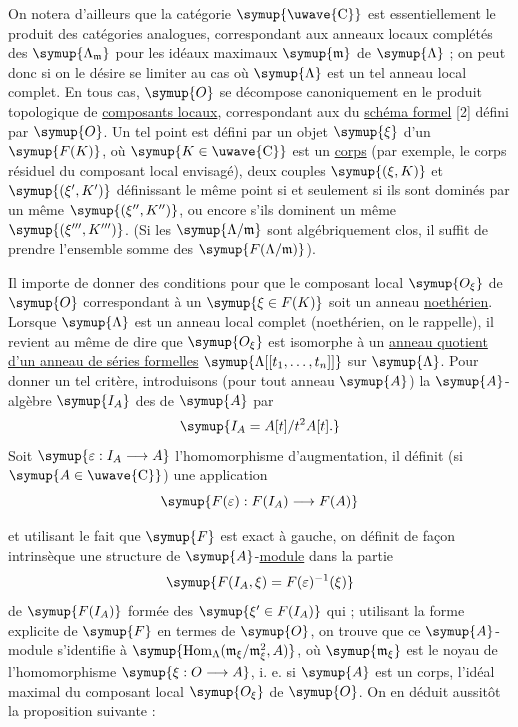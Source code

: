 On notera d'ailleurs que la catégorie $\symup{\text{\uwave{C}}}$ est essentiellement le
produit des catégories analogues, correspondant aux anneaux locaux complétés
des $\symup{\Lambda_{\mathfrak m}}$ pour les idéaux maximaux $\symup{\mathfrak m}$ de
$\symup{\Lambda}$ ; on peut donc si on le désire se limiter au cas où $\symup{\Lambda}$ est un
tel anneau local complet. En tous cas, $\symup{O}$ se décompose canoniquement en le
produit topologique de \uline{composants locaux}, correspondant aux  du
\uline{schéma formel} [2] défini par $\symup{O}$. Un tel point est défini par un objet $\symup{\xi}$
d'un $\symup{F(K)}$, où $\symup{K\in\text{\uwave{C}}}$ est un \uline{corps} (par exemple, le corps résiduel
du composant local envisagé), deux couples $\symup{(\xi,K)}$ et $\symup{(\xi',K')}$
définissant le même point si et seulement si ils sont dominés par un même
$\symup{(\xi'',K'')}$, ou encore s'ils dominent un même $\symup{(\xi''',K''')}$. (Si les
$\symup{\Lambda/\mathfrak m}$ sont algébriquement clos, il suffit de prendre l'ensemble
somme des $\symup{F(\Lambda/\mathfrak m)}$).

Il importe de donner des conditions pour que le composant local $\symup{O_\xi}$ de
$\symup{O}$ correspondant à un $\symup{\xi\in F(K)}$ soit un anneau \uline{noethérien}. Lorsque
$\symup{\Lambda}$ est un anneau local complet (noethérien, on le rappelle), il revient
au même de dire que $\symup{O_\xi}$ est isomorphe à un \uline{anneau quotient d'un anneau de séries formelles} $\symup{\Lambda[[t_1,\ldots,t_n]]}$ sur $\symup{\Lambda}$. Pour donner un tel
critère, introduisons (pour tout anneau $\symup{A}$) la $\symup{A}$-algèbre $\symup{I_A}$ des  de $\symup{A}$ par
\[
  \symup{I_A=A[t]/t^2A[t].}
\]
Soit $\symup{\varepsilon:I_A\longrightarrow A}$ l'homomorphisme d'augmentation, il
définit (si $\symup{A\in\text{\uwave{C}}}$) une application
\[
  \symup{F(\varepsilon):F(I_A)\longrightarrow F(A)}
\]

et utilisant le fait que $\symup{F}$ est exact à gauche, on définit de façon
intrinsèque une structure de $\symup{A}$-\uline{module} dans la partie
\[
  \symup{F(I_A,\xi)=F(\varepsilon)^{-1}(\xi)}
\]
de $\symup{F(I_A)}$ formée des $\symup{\xi'\in F(I_A)}$ qui  ;
utilisant la forme explicite de $\symup{F}$ en termes de $\symup{O}$, on trouve que ce
$\symup{A}$-module s'identifie à $\symup{\operatorname{Hom}_{\Lambda}(\mathfrak m_\xi/\mathfrak m_\xi^2,A)}$, où $\symup{\mathfrak m_\xi}$ est le noyau de l'homomorphisme
$\symup{\xi:O\longrightarrow A}$, i. e. si $\symup{A}$ est un corps, l'idéal maximal du
composant local $\symup{O_\xi}$ de $\symup{O}$. On en déduit aussitôt la proposition suivante :

